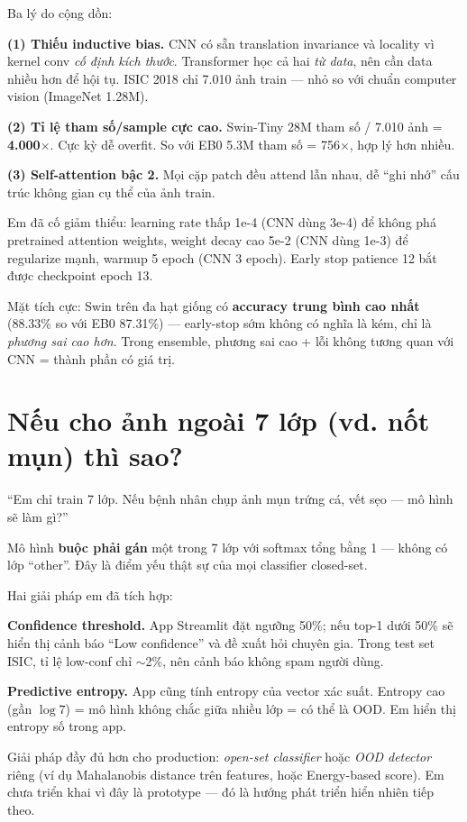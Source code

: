 \documentclass[11pt,a4paper]{article}
\begin{document}
\begin{answer}
Ba lý do cộng dồn:

\textbf{(1) Thiếu inductive bias.} CNN có sẵn translation invariance và locality vì kernel conv \textit{cố định kích thước}. Transformer học cả hai \textit{từ data}, nên cần data nhiều hơn để hội tụ. ISIC 2018 chỉ 7.010 ảnh train --- nhỏ so với chuẩn computer vision (ImageNet 1.28M).

\textbf{(2) Tỉ lệ tham số/sample cực cao.} Swin-Tiny 28M tham số / 7.010 ảnh = \textbf{4.000$\times$}. Cực kỳ dễ overfit. So với EB0 5.3M tham số = 756$\times$, hợp lý hơn nhiều.

\textbf{(3) Self-attention bậc 2.} Mọi cặp patch đều attend lẫn nhau, dễ ``ghi nhớ'' cấu trúc không gian cụ thể của ảnh train.

Em đã cố giảm thiểu: learning rate thấp 1e-4 (CNN dùng 3e-4) để không phá pretrained attention weights, weight decay cao 5e-2 (CNN dùng 1e-3) để regularize mạnh, warmup 5 epoch (CNN 3 epoch). Early stop patience 12 bắt được checkpoint epoch 13.

Mặt tích cực: Swin trên đa hạt giống có \textbf{accuracy trung bình cao nhất} (88.33\% so với EB0 87.31\%) --- early-stop sớm không có nghĩa là kém, chỉ là \textit{phương sai cao hơn}. Trong ensemble, phương sai cao + lỗi không tương quan với CNN = thành phần có giá trị.
\end{answer}

\section{Nếu cho ảnh ngoài 7 lớp (vd. nốt mụn) thì sao?}

\begin{question}
``Em chỉ train 7 lớp. Nếu bệnh nhân chụp ảnh mụn trứng cá, vết sẹo --- mô hình sẽ làm gì?''
\end{question}

\begin{answer}
Mô hình \textbf{buộc phải gán} một trong 7 lớp với softmax tổng bằng 1 --- không có lớp ``other''. Đây là điểm yếu thật sự của mọi classifier closed-set.

Hai giải pháp em đã tích hợp:

\textbf{Confidence threshold.} App Streamlit đặt ngưỡng 50\%; nếu top-1 dưới 50\% sẽ hiển thị cảnh báo ``Low confidence'' và đề xuất hỏi chuyên gia. Trong test set ISIC, tỉ lệ low-conf chỉ $\sim$2\%, nên cảnh báo không spam người dùng.

\textbf{Predictive entropy.} App cũng tính entropy của vector xác suất. Entropy cao (gần $\log 7$) = mô hình không chắc giữa nhiều lớp = có thể là OOD. Em hiển thị entropy số trong app.

Giải pháp đầy đủ hơn cho production: \textit{open-set classifier} hoặc \textit{OOD detector} riêng (ví dụ Mahalanobis distance trên features, hoặc Energy-based score). Em chưa triển khai vì đây là prototype --- đó là hướng phát triển hiển nhiên tiếp theo.
\end{answer}
\end{document}
